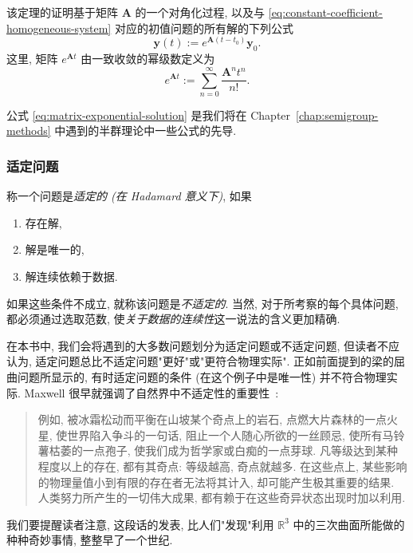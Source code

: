 该定理的证明基于矩阵 $\bm{A}$ 的一个对角化过程, 以及与 \eqref{eq:constant-coefficient-homogeneous-system} 对应的初值问题的所有解的下列公式
\begin{equation}\label{eq:matrix-exponential-solution}
\bm{y}(t):=e^{\bm{A}(t-t_0)}\bm{y}_0.
\end{equation}
这里, 矩阵 $e^{\bm{A}t}$ 由一致收敛的幂级数定义为
\begin{equation}\label{eq:matrix-exponential-series}
e^{\bm{A}t}:=\sum_{n=0}^{\infty}\dfrac{\bm{A}^nt^n}{n!}.
\end{equation}


公式 \eqref{eq:matrix-exponential-solution} 是我们将在 Chapter~\ref{chap:semigroup-methods} 中遇到的半群理论中一些公式的先导.

\subsubsection{适定问题}\label{subsec:wellposed-problems}

称一个问题是\emph{适定的 (在 Hadamard 意义下)}, 如果
\begin{enumerate}
\item 存在解,
\item 解是唯一的,
\item 解连续依赖于数据.
\end{enumerate}

如果这些条件不成立, 就称该问题是\emph{不适定的}. 当然, 对于所考察的每个具体问题, 都必须通过选取范数, 使\emph{关于数据的连续性}这一说法的含义更加精确.

在本书中, 我们会将遇到的大多数问题划分为适定问题或不适定问题, 但读者不应认为, 适定问题总比不适定问题"更好"或"更符合物理实际". 正如前面提到的梁的屈曲问题所显示的, 有时适定问题的条件 (在这个例子中是唯一性) 并不符合物理实际. Maxwell 很早就强调了自然界中不适定性的重要性~\cite{Max}:

\begin{quote}
例如, 被冰霜松动而平衡在山坡某个奇点上的岩石, 点燃大片森林的一点火星, 使世界陷入争斗的一句话, 阻止一个人随心所欲的一丝顾忌, 使所有马铃薯枯萎的一点孢子, 使我们成为哲学家或白痴的一点芽球. 凡等级达到某种程度以上的存在, 都有其奇点: 等级越高, 奇点就越多. 在这些点上, 某些影响的物理量值小到有限的存在者无法将其计入, 却可能产生极其重要的结果. 人类努力所产生的一切伟大成果, 都有赖于在这些奇异状态出现时加以利用.
\end{quote}

我们要提醒读者注意, 这段话的发表, 比人们"发现"利用 $\mathbb{R}^3$ 中的三次曲面所能做的种种奇妙事情, 整整早了一个世纪.

